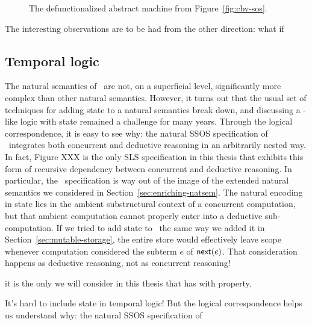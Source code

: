 \begin{figure}[t]
\caption{The defunctionalized abstract machine from Figure~\ref{fig:cbv-sos}.}
\label{fig:cbv-sos-defun}
\end{figure}

The interesting observations are to be had from the other direction: what if

\subsection{Temporal logic}

The natural semantics of \rowan~are not, on a superficial level,
significantly more complex than other natural semantics. However, it
turns out that the usual set of techniques for adding state to a
natural semantics break down, and discussing a \rowan-like logic with
state remained a challenge for many years. Through the
logical correspondence, it is easy to see why: the natural SSOS
specification of \rowan~integrates both concurrent and deductive
reasoning in an arbitrarily nested way. In fact, Figure XXX is the
only SLS specification in this thesis that exhibits this form of
recursive dependency between concurrent and deductive reasoning.  In
particular, the \rowan~specification is way out of the image of the
extended natural semantics we considered in
Section~\ref{sec:enriching-natsem}. The natural encoding in state lies
in the ambient substructural context of a concurrent computation, but
that ambient computation cannot properly enter into a deductive
sub-computation. If we tried to add state to \rowan~the same way we
added it in Section~\ref{sec:mutable-storage}, the entire store
would effectively leave scope whenever computation considered
the subterm $e$ of ${\sf next}(e)$. That consideration happens
as deductive reasoning, not as concurrent reasoning!

 it is the only we
will consider in this thesis that has with property.

It's hard to include state in temporal logic! But the logical correspondence
helps us understand why: the natural SSOS specification of 

